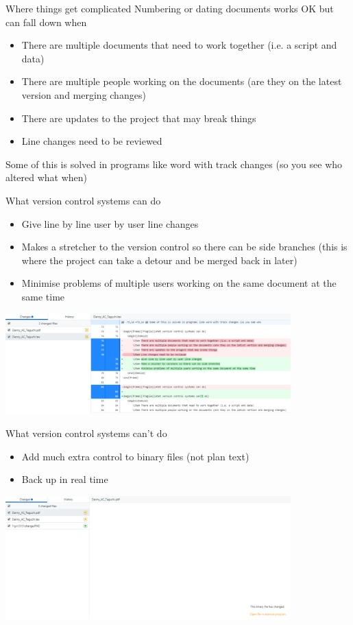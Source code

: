 \documentclass[10pt]{beamer}
\begin{document}
\begin{frame}[fragile]{Where things get complicated}
Numbering or dating documents works OK but can fall down when\\
\begin{itemize}
\item There are multiple documents that need to work together (i.e. a script and data)
\item There are multiple people working on the documents (are they on the latest version and merging changes)
\item There are updates to the project that may break things
\item Line changes need to be reviewed
\end{itemize}

Some of this is solved in programs like word with track changes (so you see who altered what when)
\end{frame}


\begin{frame}[fragile]{What version control systems can do}
\begin{itemize}
\item Give line by line user by user line changes
\item Makes a stretcher to the version control so there can be side branches (this is where the project can take a detour and be merged back in later)
\item Minimise problems of multiple users working on the same document at the same time
\end{itemize}
\includegraphics[width=11cm]{Figs/GHD/change}
\end{frame}


\begin{frame}[fragile]{What version control systems can't do}
\begin{itemize}
\item Add much extra control to binary files (not plan text)
\item Back up in real time
\end{itemize}
\includegraphics[width=11cm]{Figs/GHD/binarychange}
\end{frame}
\end{document}
